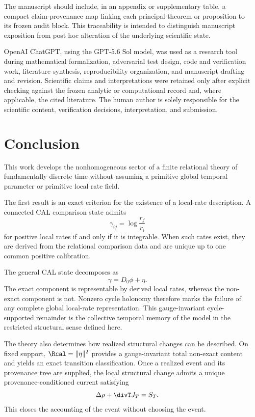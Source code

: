 The manuscript should include, in an appendix or supplementary table, a compact claim-provenance map linking each principal theorem or proposition to its frozen audit block. This traceability is intended to distinguish manuscript exposition from post hoc alteration of the underlying scientific state.

OpenAI ChatGPT, using the GPT-5.6 Sol model, was used as a research tool during mathematical formalization, adversarial test design, code and verification work, literature synthesis, reproducibility organization, and manuscript drafting and revision. Scientific claims and interpretations were retained only after explicit checking against the frozen analytic or computational record and, where applicable, the cited literature. The human author is solely responsible for the scientific content, verification decisions, interpretation, and submission.

\section{Conclusion}
\label{sec:conclusion}

This work develops the nonhomogeneous sector of a finite relational theory of fundamentally discrete time without assuming a primitive global temporal parameter or primitive local rate field.

The first result is an exact criterion for the existence of a local-rate description. A connected CAL comparison state admits
\begin{equation}
\gamma_{ij}=\log\frac{r_j}{r_i}
\end{equation}
for positive local rates if and only if it is integrable. When such rates exist, they are derived from the relational comparison data and are unique up to one common positive calibration.

The general CAL state decomposes as
\begin{equation}
\gamma=D_0\phi+\eta.
\end{equation}
The exact component is representable by derived local rates, whereas the non-exact component is not. Nonzero cycle holonomy therefore marks the failure of any complete global local-rate representation. This gauge-invariant cycle-supported remainder is the collective temporal memory of the model in the restricted structural sense defined here.

The theory also determines how realized structural changes can be described. On fixed support, $\Rcal=\|\eta\|^2$ provides a gauge-invariant total non-exact content and yields an exact transition classification. Once a realized event and its provenance tree are supplied, the local structural change admits a unique provenance-conditioned current satisfying
\begin{equation}
\Delta\rho+\divT J_T=S_T.
\end{equation}
This closes the accounting of the event without choosing the event.

